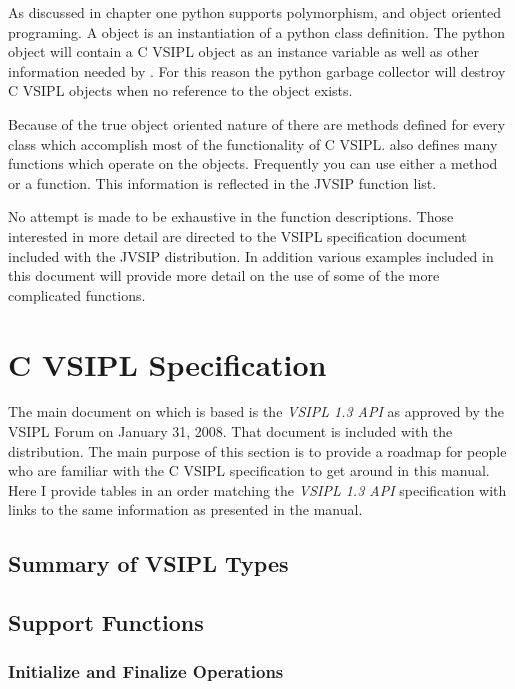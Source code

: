 As discussed in chapter one python supports polymorphism, and object oriented programing. A \pyjv object is an instantiation of a python class definition. The python object will contain a C VSIPL object as an instance variable as well as other information needed by \pyjv. For this reason the python garbage collector will destroy C VSIPL objects when no reference to the \pyjv object exists.

Because of the true object oriented nature of \pyjv there are methods defined for every class which accomplish most of the functionality of C VSIPL.  also defines many functions which operate on the \pyjv objects. Frequently you can use either a method or a function. This information is reflected in the JVSIP function list.

No attempt is made to be exhaustive in the function descriptions. Those interested in more detail are directed to the VSIPL specification document included with the JVSIP distribution. In addition various examples included in this document will provide more detail on the use of some of the more complicated functions.
%
\section*{C VSIPL Specification}
The main document on which  is based is the \emph{VSIPL 1.3 API} as approved by the VSIPL Forum on January 31, 2008.  That document is included with the  distribution.  The main purpose of this section is to provide a roadmap for people who are familiar with the C VSIPL specification to get around in this  manual.  Here I provide tables in an order matching the \emph{VSIPL 1.3 API} specification with links to the same information as presented  in the  manual.
\subsection*{Summary of VSIPL Types}
\subsection*{Support Functions}
    
\subsubsection*{Initialize and Finalize Operations}
